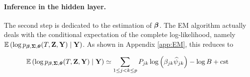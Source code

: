 \paragraph{Inference in the hidden layer.} The second step is dedicated to the estimation of ${\boldsymbol{\beta}}$. The EM algorithm actually deals with the conditional expectation of the complete log-likelihood, namely $\operatorname*{\mathbb{E}}\left(\log p_{{\boldsymbol{\beta}}, {\boldsymbol{\Sigma}}, {\boldsymbol{\theta}}}(T, {\bf Z}, {\bf Y}) \; | \; {\bf Y}\right)$. 
As shown in Appendix \ref{app:EM}, this  reduces to
 
\begin{equation} \label{expectation}
    \operatorname*{\mathbb{E}}\left(\log p_{{\boldsymbol{\beta}}, {\boldsymbol{\Sigma}}, {\boldsymbol{\theta}}}(T, {\bf Z}, {\bf Y}) \; | \; {\bf Y}\right)
    \simeq
    \sum_{1 \leq j < k \leq p} P_{jk} \log \left(\beta_{jk} \widehat{\psi}_{jk}\right) - \log B + \text{cst}
\end{equation}
 
